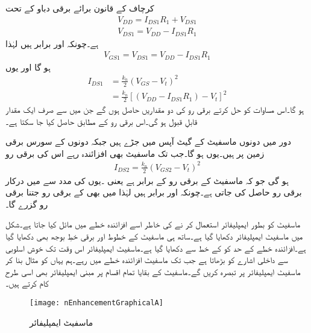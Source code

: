کرچاف کے قانون برائے برقی دباو کے تحت
\begin{align*}
V_{DD}=I_{DS1}R_1+V_{DS1}\\
V_{DS1}=V_{DD}-I_{DS1}R_1
\end{align*}
ہے۔چونکہ  اور  برابر ہیں لہٰذا
\begin{align*}
V_{GS1}=V_{DS1}=V_{DD}-I_{DS1}R_1
\end{align*}
ہو گا اور یوں
\begin{align*}
I_{DS1}&=\frac{k_n}{2}\left(V_{GS}-V_t \right )^2 \\
&=\frac{k_n}{2} \left[\left(V_{DD}-I_{DS1} R_1 \right )-V_t \right ]^{2}
\end{align*}
ہو گا۔اس مساوات کو حل کرتے برقی رو کی دو مقداریں حاصل ہوں گے جن میں سے صرف ایک مقدار قابلِ قبول ہو گی۔اس برقی رو کے مطابق  حاصل کیا جا سکتا ہے۔

دور میں دونوں ماسفیٹ کے گیٹ آپس میں جڑے ہیں جبکہ دونوں کے سورس برقی زمین پر ہیں۔یوں  ہو گا۔جب تک ماسفیٹ  بھی افزائندہ رہے اس کی برقی رو
\begin{align*}
I_{DS2}=\frac{k_n}{2} \left(V_{GS2}-V_t \right )^2
\end{align*}
ہو گی جو کہ ماسفیٹ  کے برقی رو کے برابر ہے یعنی  ۔یوں   کی مدد سے   میں درکار برقی رو حاصل کی جاتی ہے۔چونکہ   اور  برابر ہیں لہٰذا  میں بھی  کے برقی رو جتنا برقی رو گزرے گا۔


ماسفیٹ کو بطور ایمپلیفائر استعمال کر نے کی خاطر اسے افزائندہ خطے میں مائل کیا جاتا ہے۔شکل  میں ماسفیٹ ایمپلیفائر دکھایا گیا ہے۔ساتھ ہی ماسفیٹ کے خطوط اور برقی خطِ بوجھ بھی دکھایا گیا ہے۔افزائندہ خطے کے حد کو  کے خط سے دکھایا گیا ہے۔ماسفیٹ ایمپلیفائر اس وقت تک خوش اسلوبی سے داخلی اشارے کو بڑھاتا ہے جب تک ماسفیٹ افزائندہ خطے میں رہے۔ہم یہاں  کو مثال بنا کر ماسفیٹ ایمپلیفائر پر تبصرہ کریں گے۔ماسفیٹ کے بقایا تمام اقسام پر مبنی ایمپلیفائر بھی اسی طرح کام کرتے ہیں۔
\begin{figure}
\centering
\texttt{[image: nEnhancementGraphicalA]}
\caption{ماسفیٹ ایمپلیفائر}
\label{شکل_ماسفیٹ_ایمپلیفائر_ترسیمی_تجزیہ}
\end{figure}

